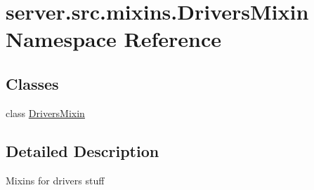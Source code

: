 \hypertarget{namespaceserver_1_1src_1_1mixins_1_1_drivers_mixin}{}\section{server.\+src.\+mixins.\+Drivers\+Mixin Namespace Reference}
\label{namespaceserver_1_1src_1_1mixins_1_1_drivers_mixin}
\subsection*{Classes}
\begin{DoxyCompactItemize}
\item 
class \hyperlink{classserver_1_1src_1_1mixins_1_1_drivers_mixin_1_1_drivers_mixin}{Drivers\+Mixin}
\end{DoxyCompactItemize}


\subsection{Detailed Description}
\begin{DoxyVerb}Mixins for drivers stuff\end{DoxyVerb}
 